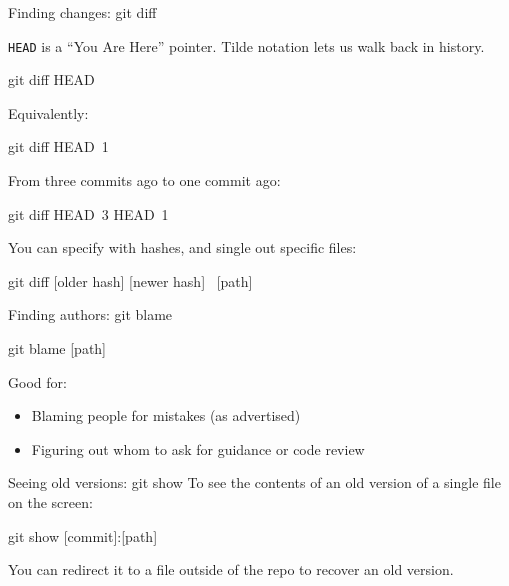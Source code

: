 \begin{frame}[fragile]{Finding changes: git diff}

  \texttt{HEAD} is a ``You Are Here'' pointer. Tilde notation lets us
  walk back in history.

  \begin{gitCommand}git diff HEAD~\end{gitCommand}

  Equivalently:

  \begin{gitCommand}git diff HEAD~1\end{gitCommand}

  From three commits ago to one commit ago:

  \begin{gitCommand}git diff HEAD~3 HEAD~1\end{gitCommand}

  You can specify with hashes, and single out specific files:

  \begin{gitCommand}
git diff [older hash] [newer hash] \
  [path]
  \end{gitCommand}

\end{frame}

\begin{frame}[fragile]{Finding authors: git blame}

  \begin{gitCommand}git blame [path]\end{gitCommand}

  Good for:

  \begin{itemize}
    \item Blaming people for mistakes (as advertised)
    \item Figuring out whom to ask for guidance or code review
  \end{itemize}

\end{frame}

\begin{frame}[fragile]{Seeing old versions: git show}
  To see the contents of an old version of a single file on the screen:

  \begin{gitCommand}git show [commit]:[path]\end{gitCommand}

  You can redirect it to a file outside of the repo to recover an old version.
\end{frame}

